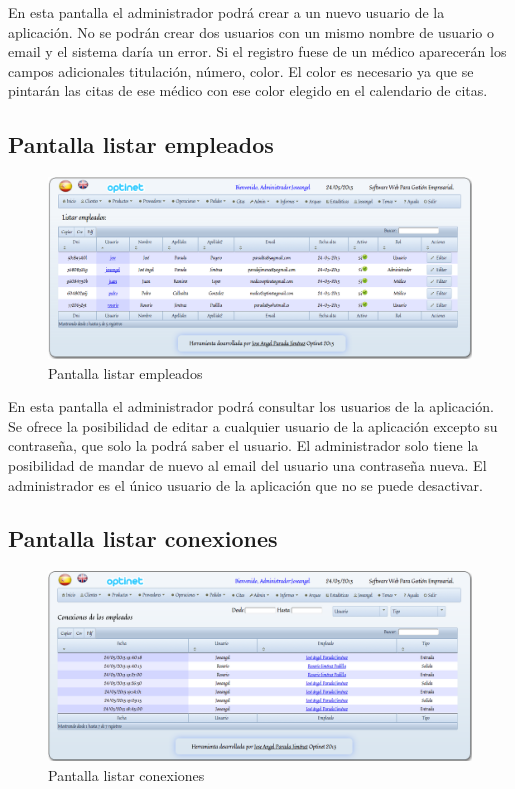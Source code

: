 \documentclass[a4paper,11pt]{book}
\begin{document}
En esta pantalla el administrador podrá crear a un nuevo usuario de la aplicación. No se podrán crear dos usuarios con un mismo nombre de usuario o email y el sistema daría un error. Si el registro fuese de un médico aparecerán los campos adicionales titulación, número, color. El color es necesario ya que se pintarán las citas de ese médico con ese color elegido en el calendario de citas.

\newpage
\subsection {Pantalla listar empleados}

\begin{figure}[!htb]
  \centering
    \includegraphics[scale=0.35]{caplistarempleados.png}
  \caption{Pantalla listar empleados}
  \label{a}
\end{figure}

En esta pantalla el administrador podrá consultar los usuarios de la aplicación. Se ofrece la posibilidad de editar a cualquier usuario de la aplicación excepto su contraseña, que solo la podrá saber el usuario. El administrador solo tiene la posibilidad de mandar de nuevo al email del usuario una contraseña nueva. El administrador es el único usuario de la aplicación que no se puede desactivar.

\subsection {Pantalla listar conexiones}

\begin{figure}[!htb]
  \centering
    \includegraphics[scale=0.35]{capconexiones.png}
  \caption{Pantalla listar conexiones}
  \label{a}
\end{figure}
\end{document}
